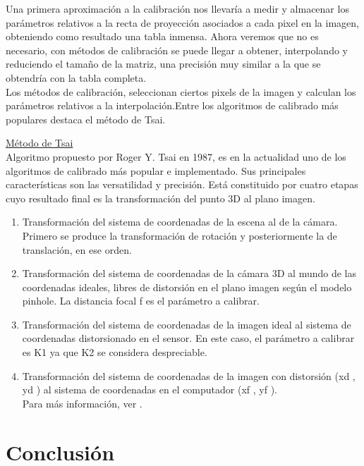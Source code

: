 \documentclass[a4,10pt]{article}
\begin{document}
\begin{enumerate}
\begin {itemize}
\end {itemize}
Una primera aproximación a la calibración nos llevaría a medir y almacenar los parámetros relativos a la recta de proyección asociados a cada pixel en la imagen, obteniendo como resultado una tabla inmensa. Ahora veremos que no es necesario, con métodos de calibración se puede llegar a obtener, interpolando y reduciendo el tamaño de la matriz, una precisión muy similar a la que se obtendría con la tabla completa.\\
Los métodos de calibración, seleccionan ciertos pixels de la imagen y calculan los parámetros relativos a la interpolación.Entre los algoritmos de calibrado más populares destaca el método de Tsai.

\underline{Método de Tsai}\\
Algoritmo propuesto por Roger Y. Tsai en 1987, es en la actualidad uno de los algoritmos de calibrado más popular e implementado. Sus principales características son las versatilidad y precisión. Está constituido por cuatro etapas cuyo resultado final es la transformación del punto 3D al plano imagen.
\begin{enumerate}
\item Transformación del sistema de coordenadas de la escena al de la cámara. Primero se produce la transformación de rotación y posteriormente la de translación, en ese orden.
\item Transformación del sistema de coordenadas de la cámara 3D al mundo de las coordenadas ideales, libres de distorsión en el plano imagen según el modelo pinhole. La distancia focal f es el parámetro a calibrar.
\item Transformación del sistema de coordenadas de la imagen ideal al sistema de coordenadas distorsionado en el sensor. En este caso, el parámetro a calibrar es K1 ya que K2 se considera despreciable.
\item Transformación del sistema de coordenadas de la imagen con distorsión (xd , yd ) al sistema de coordenadas en el computador (xf , yf ).\\
Para más información, ver \cite{tsai}. 
\end{enumerate}
\end {enumerate}


\section{Conclusión}






\end{document}
